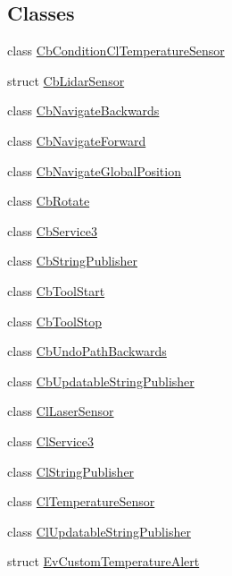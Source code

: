 \subsection*{Classes}
\begin{DoxyCompactItemize}
\item 
class \hyperlink{classsm__dance__bot_1_1CbConditionClTemperatureSensor}{Cb\+Condition\+Cl\+Temperature\+Sensor}
\item 
struct \hyperlink{structsm__dance__bot_1_1CbLidarSensor}{Cb\+Lidar\+Sensor}
\item 
class \hyperlink{classsm__dance__bot_1_1CbNavigateBackwards}{Cb\+Navigate\+Backwards}
\item 
class \hyperlink{classsm__dance__bot_1_1CbNavigateForward}{Cb\+Navigate\+Forward}
\item 
class \hyperlink{classsm__dance__bot_1_1CbNavigateGlobalPosition}{Cb\+Navigate\+Global\+Position}
\item 
class \hyperlink{classsm__dance__bot_1_1CbRotate}{Cb\+Rotate}
\item 
class \hyperlink{classsm__dance__bot_1_1CbService3}{Cb\+Service3}
\item 
class \hyperlink{classsm__dance__bot_1_1CbStringPublisher}{Cb\+String\+Publisher}
\item 
class \hyperlink{classsm__dance__bot_1_1CbToolStart}{Cb\+Tool\+Start}
\item 
class \hyperlink{classsm__dance__bot_1_1CbToolStop}{Cb\+Tool\+Stop}
\item 
class \hyperlink{classsm__dance__bot_1_1CbUndoPathBackwards}{Cb\+Undo\+Path\+Backwards}
\item 
class \hyperlink{classsm__dance__bot_1_1CbUpdatableStringPublisher}{Cb\+Updatable\+String\+Publisher}
\item 
class \hyperlink{classsm__dance__bot_1_1ClLaserSensor}{Cl\+Laser\+Sensor}
\item 
class \hyperlink{classsm__dance__bot_1_1ClService3}{Cl\+Service3}
\item 
class \hyperlink{classsm__dance__bot_1_1ClStringPublisher}{Cl\+String\+Publisher}
\item 
class \hyperlink{classsm__dance__bot_1_1ClTemperatureSensor}{Cl\+Temperature\+Sensor}
\item 
class \hyperlink{classsm__dance__bot_1_1ClUpdatableStringPublisher}{Cl\+Updatable\+String\+Publisher}
\item 
struct \hyperlink{structsm__dance__bot_1_1EvCustomTemperatureAlert}{Ev\+Custom\+Temperature\+Alert}
\item 

\end{DoxyCompactItemize}

